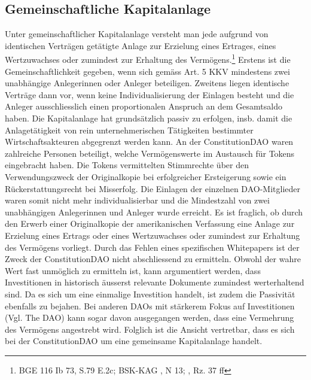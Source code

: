 \documentclass[a4paper,12pt]{report}
\begin{document}
	\subsection{Gemeinschaftliche Kapitalanlage}
	\startsubsection
	Unter gemeinschaftlicher Kapitalanlage versteht man jede aufgrund von identischen Verträgen getätigte Anlage zur Erzielung eines Ertrages, eines Wertzuwachses oder zumindest zur Erhaltung des Vermögens.\footnote{\hspace{0.5em}BGE 116 Ib 73, S.79 E.2c; BSK-KAG \citeauthor{BSKRP}, N 13; \citeauthor{EG17}, Rz. 37 ff} Erstens ist die Gemeinschaftlichkeit gegeben, wenn sich gemäss Art. 5 KKV mindestens zwei unabhängige Anlegerinnen oder Anleger beteiligen. Zweitens liegen identische Verträge dann vor, wenn keine Individualisierung der Einlagen besteht und die Anleger ausschliesslich einen proportionalen Anspruch an dem Gesamtsaldo haben. Die Kapitalanlage hat grundsätzlich passiv zu erfolgen, insb. damit die Anlagetätigkeit von rein unternehmerischen Tätigkeiten bestimmter Wirtschaftsakteuren abgegrenzt werden kann. An der ConstitutionDAO waren zahlreiche Personen beteiligt, welche Vermögenswerte im Austausch für Tokens eingebracht haben. Die Tokens vermittelten Stimmrechte über den Verwendungszweck der Originalkopie bei erfolgreicher Ersteigerung sowie ein Rückerstattungsrecht bei Misserfolg. Die Einlagen der einzelnen DAO-Mitglieder waren somit nicht mehr individualisierbar und die Mindestzahl von zwei unabhängigen Anlegerinnen und Anleger wurde erreicht. Es ist fraglich, ob durch den Erwerb einer Originalkopie der amerikanischen Verfassung eine Anlage zur Erzielung eines Ertrags oder eines Wertzuwachses oder zumindest zur Erhaltung des Vermögens vorliegt. Durch das Fehlen eines spezifischen Whitepapers ist der Zweck der ConstitutionDAO nicht abschliessend zu ermitteln. Obwohl der wahre Wert fast unmöglich zu ermitteln ist, kann argumentiert werden, dass Investitionen in historisch äusserst relevante Dokumente zumindest werterhaltend sind. Da es sich um eine einmalige Investition handelt, ist zudem die Passivität ebenfalls zu bejahen. Bei anderen DAOs mit stärkerem Fokus auf Investitionen (Vgl. The DAO) kann sogar davon ausgegangen werden, dass eine Vermehrung des Vermögens angestrebt wird. Folglich ist die Ansicht vertretbar, dass es sich bei der ConstitutionDAO um eine gemeinsame Kapitalanlage handelt.
	\closesection 
	
\end{document}
